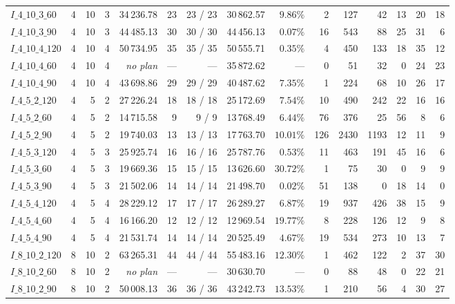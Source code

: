 \begin{table}[!htbp]
{\begin{tabular}{lrrrrrrlrrrrrrr}
$I\_4\_10\_3\_60$ & 4 & 10 & 3 & 34\,236.78 & 23 & 23 / 23 & 30\,862.57 & $9.86\%$ & 2 & 127 & 42 & 13 & 20 & 18 \\
$I\_4\_10\_3\_90$ & 4 & 10 & 3 & 44\,485.13 & 30 & 30 / 30 & 44\,456.13 & $0.07\%$ & 16 & 543 & 88 & 25 & 31 & 6 \\
$I\_4\_10\_4\_120$ & 4 & 10 & 4 & 50\,734.95 & 35 & 35 / 35 & 50\,555.71 & $0.35\%$ & 4 & 450 & 133 & 18 & 35 & 12 \\
$I\_4\_10\_4\_60$ & 4 & 10 & 4 & \emph{no plan} & --- & --- & 35\,872.62 & --- & 0 & 51 & 32 & 0 & 24 & 23 \\
$I\_4\_10\_4\_90$ & 4 & 10 & 4 & 43\,698.86 & 29 & 29 / 29 & 40\,487.62 & $7.35\%$ & 1 & 224 & 68 & 10 & 26 & 17 \\
$I\_4\_5\_2\_120$ & 4 & 5 & 2 & 27\,226.24 & 18 & 18 / 18 & 25\,172.69 & $7.54\%$ & 10 & 490 & 242 & 22 & 16 & 16 \\
$I\_4\_5\_2\_60$ & 4 & 5 & 2 & 14\,715.58 & 9 & 9 / 9 & 13\,768.49 & $6.44\%$ & 76 & 376 & 25 & 56 & 8 & 6 \\
$I\_4\_5\_2\_90$ & 4 & 5 & 2 & 19\,740.03 & 13 & 13 / 13 & 17\,763.70 & $10.01\%$ & 126 & 2430 & 1193 & 12 & 11 & 9 \\
$I\_4\_5\_3\_120$ & 4 & 5 & 3 & 25\,925.74 & 16 & 16 / 16 & 25\,787.76 & $0.53\%$ & 11 & 463 & 191 & 45 & 16 & 6 \\
$I\_4\_5\_3\_60$ & 4 & 5 & 3 & 19\,669.36 & 15 & 15 / 15 & 13\,626.60 & $30.72\%$ & 1 & 75 & 30 & 0 & 9 & 9 \\
$I\_4\_5\_3\_90$ & 4 & 5 & 3 & 21\,502.06 & 14 & 14 / 14 & 21\,498.70 & $0.02\%$ & 51 & 138 & 0 & 18 & 14 & 0 \\
$I\_4\_5\_4\_120$ & 4 & 5 & 4 & 28\,229.12 & 17 & 17 / 17 & 26\,289.27 & $6.87\%$ & 19 & 937 & 426 & 38 & 15 & 9 \\
$I\_4\_5\_4\_60$ & 4 & 5 & 4 & 16\,166.20 & 12 & 12 / 12 & 12\,969.54 & $19.77\%$ & 8 & 228 & 126 & 12 & 9 & 8 \\
$I\_4\_5\_4\_90$ & 4 & 5 & 4 & 21\,531.74 & 14 & 14 / 14 & 20\,525.49 & $4.67\%$ & 19 & 534 & 273 & 10 & 13 & 7 \\
$I\_8\_10\_2\_120$ & 8 & 10 & 2 & 63\,265.31 & 44 & 44 / 44 & 55\,483.16 & $12.30\%$ & 1 & 462 & 122 & 2 & 37 & 30 \\
$I\_8\_10\_2\_60$ & 8 & 10 & 2 & \emph{no plan} & --- & --- & 30\,630.70 & --- & 0 & 88 & 48 & 0 & 22 & 21 \\
$I\_8\_10\_2\_90$ & 8 & 10 & 2 & 50\,008.13 & 36 & 36 / 36 & 43\,242.73 & $13.53\%$ & 1 & 210 & 56 & 4 & 30 & 27 \\

\end{tabular}}
\end{table}
